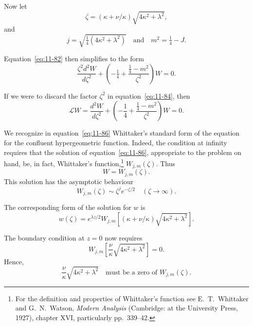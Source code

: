 Now let
\begin{equation}
\label{eq:11-83}
\zeta = (\kappa+\nu/\kappa)\sqrt{4\kappa^2+\lambda^2},
\end{equation}
and
\begin{equation}
\label{eq:11-84}
j = \sqrt{\tfrac{1}{4}(4\kappa^2+\lambda^2)} \quad\text{and}\quad m^2 = \tfrac{1}{4}-J.
\end{equation}

Equation~\eqref{eq:11-82} then simplifies to the form
\begin{equation}
\label{eq:11-85}
\frac{\zeta^2 d^2W}{d\zeta^2}+\left(-\tfrac{1}{4}+\frac{\tfrac{1}{4}-m^2}{\zeta^2}\right)W = 0.
\end{equation}

If we were to discard the factor $\zeta^2$ in equation~\eqref{eq:11-84}, then
\begin{equation}
\label{eq:11-86}
\mathscr{L}W = \frac{d^2W}{d\zeta^2}+\left(-\frac{1}{4}+\frac{\frac{1}{4}-m^2}{\zeta^2}\right)W = 0.
\end{equation}

We recognize in equation~\eqref{eq:11-86} Whittaker's standard form of the equation for the confluent hypergeometric function. Indeed, the condition at infinity requires that the solution of equation~\eqref{eq:11-86}, appropriate to the problem on hand, be, in fact, Whittaker's function,\footnote{For the definition and properties of Whittaker's function see E.\ T.\ Whittaker and G.\ N.\ Watson, \textit{Modern Analysis} (Cambridge: at the University Press, 1927), chapter XVI, particularly pp.\ 339--42.} $W_{j,m}(\zeta)$. Thus
\begin{equation}
\label{eq:11-87}
W = W_{j,m}(\zeta).
\end{equation}
This solution has the asymptotic behaviour
\begin{equation}
\label{eq:11-88}
W_{j,m}(\zeta) \sim \zeta^j e^{-\zeta/2} \quad (\zeta \to \infty).
\end{equation}

The corresponding form of the solution for $w$ is
\begin{equation}
\label{eq:11-89}
w(\zeta) = e^{\lambda z/2}W_{j,m}\!\left[(\kappa+\nu/\kappa)\sqrt{4\kappa^2+\lambda^2}\right]\!.
\end{equation}

The boundary condition at $z = 0$ now requires
\begin{equation}
\label{eq:11-90}
W_{j,m}\!\left[\frac{\nu}{\kappa}\sqrt{4\kappa^2+\lambda^2}\right] = 0.
\end{equation}
Hence,
\begin{equation}
\label{eq:11-91}
\frac{\nu}{\kappa}\sqrt{4\kappa^2+\lambda^2} \quad\text{must be a zero of } W_{j,m}(\zeta).
\end{equation}

